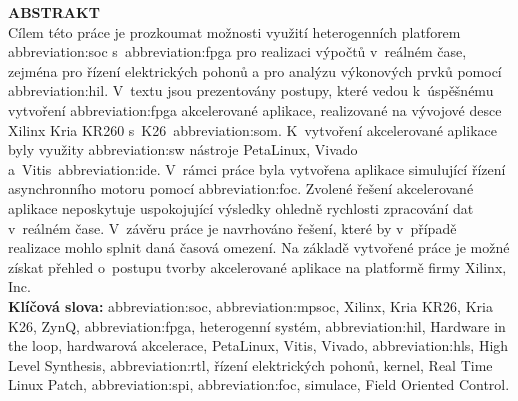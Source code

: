 \documentclass[a4paper, twoside, 11pt]{article}
\begin{document}
\newpage
\begin{minipage}[t]{7.37cm}
	\textcolor{ctublue}{\Large{\textbf{\MakeTextUppercase{Abstrakt}}}}\\
	Cílem této práce je prozkoumat možnosti využití heterogenních platforem \gls{abbreviation:soc} s~\gls{abbreviation:fpga} pro realizaci výpočtů v~reálném čase, zejména pro řízení elektrických pohonů a pro analýzu výkonových prvků pomocí \gls{abbreviation:hil}. V~textu jsou prezentovány postupy, které vedou k~úspěšnému vytvoření \gls{abbreviation:fpga} akcelerované aplikace, realizované na vývojové desce Xilinx Kria KR260 s~K26~\gls{abbreviation:som}. K~vytvoření akcelerované aplikace byly využity \gls{abbreviation:sw} nástroje PetaLinux, Vivado a~Vitis~\gls{abbreviation:ide}. V~rámci práce byla vytvořena aplikace simulující řízení asynchronního motoru pomocí \gls{abbreviation:foc}. Zvolené řešení akcelerované aplikace neposkytuje uspokojující výsledky ohledně rychlosti zpracování dat v~reálném čase. V~závěru práce je navrhováno řešení, které by v~případě realizace mohlo splnit daná časová omezení. Na základě vytvořené práce je možné získat přehled o~postupu tvorby akcelerované aplikace na platformě firmy Xilinx, Inc.\\
	\textbf{Klíčová slova:} \gls{abbreviation:soc}, \gls{abbreviation:mpsoc}, Xilinx, Kria KR26, Kria K26, ZynQ, \gls{abbreviation:fpga}, heterogenní systém, \gls{abbreviation:hil}, Hardware in the loop, hardwarová akcelerace, PetaLinux, Vitis, Vivado, \gls{abbreviation:hls}, High Level Synthesis, \gls{abbreviation:rtl}, řízení elektrických pohonů, kernel, Real Time Linux Patch, \gls{abbreviation:spi}, \gls{abbreviation:foc}, simulace, Field Oriented Control.
\end{minipage}%
\hfill%
\end{document}
